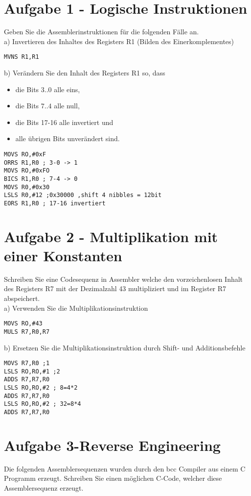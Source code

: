 \section*{Aufgabe 1 - Logische Instruktionen}
Geben Sie die Assemblerinstruktionen für die folgenden Fälle an.\\
a) Invertieren des Inhaltes des Registers R1 (Bilden des Einerkomplementes)

\begin{verbatim}
MVNS R1,R1
\end{verbatim}

b) Verändern Sie den Inhalt des Registers R1 so, dass

\begin{itemize}
  \item die Bits $3 . .0$ alle eins,
  \item die Bits $7 . .4$ alle null,
  \item die Bits 17-16 alle invertiert und
  \item alle übrigen Bits unverändert sind.
\end{itemize}

\begin{verbatim}
MOVS RO,#0xF
ORRS R1,R0 ; 3-0 -> 1
MOVS RO,#0xFO
BICS R1,R0 ; 7-4 -> 0
MOVS R0,#0x30
LSLS R0,#12 ;0x30000 ,shift 4 nibbles = 12bit
EORS R1,R0 ; 17-16 invertiert
\end{verbatim}

\section*{Aufgabe 2 - Multiplikation mit einer Konstanten}
Schreiben Sie eine Codesequenz in Assembler welche den vorzeichenlosen Inhalt des Registers R7 mit der Dezimalzahl 43 multipliziert und im Register R7 abspeichert.\\
a) Verwenden Sie die Multiplikationsinstruktion

\begin{verbatim}
MOVS RO,#43
MULS R7,R0,R7
\end{verbatim}

b) Ersetzen Sie die Multiplikationsinstruktion durch Shift- und Additionsbefehle

\begin{verbatim}
MOVS R7,R0 ;1
LSLS RO,RO,#1 ;2
ADDS R7,R7,R0
LSLS RO,RO,#2 ; 8=4*2
ADDS R7,R7,R0
LSLS RO,RO,#2 ; 32=8*4
ADDS R7,R7,R0
\end{verbatim}

\section*{Aufgabe 3-Reverse Engineering}
Die folgenden Assemblersequenzen wurden durch den bcc Compiler aus einem C Programm erzeugt. Schreiben Sie einen möglichen C-Code, welcher diese Assemblersequenz erzeugt.

